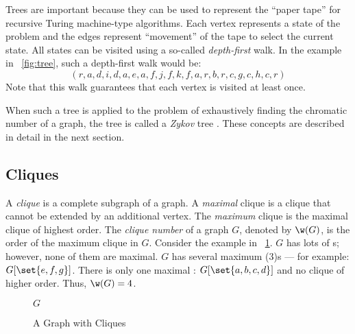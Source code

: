 Trees are important because they can be used to represent the ``paper tape'' for recursive Turing machine-type
algorithms.  Each vertex represents a state of the problem and the edges represent ``movement'' of the tape to
select the current state.  All states can be visited using a so-called \emph{depth-first} walk.  In the example in
\figurename~\ref{fig:tree}, such a depth-first walk would be:
\[(r,a,d,i,d,a,e,a,f,j,f,k,f,a,r,b,r,c,g,c,h,c,r)\]
Note that this walk guarantees that each vertex is visited at least once.

When such a tree is applied to the problem of exhaustively finding the chromatic number of a graph, the tree is
called a \emph{Zykov} tree \cite{mcdiarmid,zykov}.  These concepts are described in detail in the next section.

\subsection{Cliques}\label{sec:sub:cliques}

A \emph{clique} is a complete subgraph of a graph.  A \emph{maximal} clique is a clique that cannot be extended by
an additional vertex.  The \emph{maximum} clique is the maximal clique of highest order.  The \emph{clique number}
of a graph \(G\), denoted by \(\w(G)\), is the order of the maximum clique in \(G\).  Consider the example in
\figurename~\ref{fig:clique}.  \(G\) has lots of s; however, none of them are maximal.  \(G\) has several
maximum \clique(3)s --- for example: \(G[\set{e,f,g}]\).  There is only one maximal :
\(G[\set{a,b,c,d}]\) and no clique of higher order.  Thus, \(\w(G)=4\).

\begin{figure}[H]
  \label{fig:clique}
  \begin{center}

    \bigskip

    \(G\)
  \end{center}
  \caption{A Graph with Cliques}
\end{figure}

